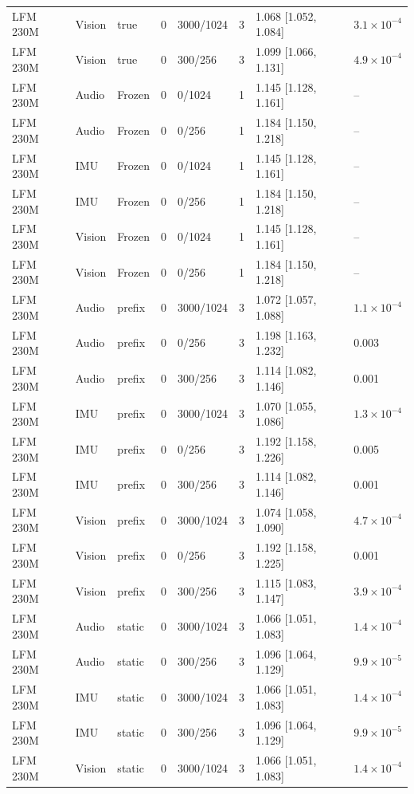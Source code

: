 {\begin{longtable}{@{}llllllll@{}}
LFM 230M & Vision & true & 0 & 3000/1024 & 3 & 1.068 [1.052, 1.084] & $3.1\times10^{-4}$ \\
LFM 230M & Vision & true & 0 & 300/256 & 3 & 1.099 [1.066, 1.131] & $4.9\times10^{-4}$ \\
LFM 230M & Audio & Frozen & 0 & 0/1024 & 1 & 1.145 [1.128, 1.161] & -- \\
LFM 230M & Audio & Frozen & 0 & 0/256 & 1 & 1.184 [1.150, 1.218] & -- \\
LFM 230M & IMU & Frozen & 0 & 0/1024 & 1 & 1.145 [1.128, 1.161] & -- \\
LFM 230M & IMU & Frozen & 0 & 0/256 & 1 & 1.184 [1.150, 1.218] & -- \\
LFM 230M & Vision & Frozen & 0 & 0/1024 & 1 & 1.145 [1.128, 1.161] & -- \\
LFM 230M & Vision & Frozen & 0 & 0/256 & 1 & 1.184 [1.150, 1.218] & -- \\
LFM 230M & Audio & prefix & 0 & 3000/1024 & 3 & 1.072 [1.057, 1.088] & $1.1\times10^{-4}$ \\
LFM 230M & Audio & prefix & 0 & 0/256 & 3 & 1.198 [1.163, 1.232] & 0.003 \\
LFM 230M & Audio & prefix & 0 & 300/256 & 3 & 1.114 [1.082, 1.146] & 0.001 \\
LFM 230M & IMU & prefix & 0 & 3000/1024 & 3 & 1.070 [1.055, 1.086] & $1.3\times10^{-4}$ \\
LFM 230M & IMU & prefix & 0 & 0/256 & 3 & 1.192 [1.158, 1.226] & 0.005 \\
LFM 230M & IMU & prefix & 0 & 300/256 & 3 & 1.114 [1.082, 1.146] & 0.001 \\
LFM 230M & Vision & prefix & 0 & 3000/1024 & 3 & 1.074 [1.058, 1.090] & $4.7\times10^{-4}$ \\
LFM 230M & Vision & prefix & 0 & 0/256 & 3 & 1.192 [1.158, 1.225] & 0.001 \\
LFM 230M & Vision & prefix & 0 & 300/256 & 3 & 1.115 [1.083, 1.147] & $3.9\times10^{-4}$ \\
LFM 230M & Audio & static & 0 & 3000/1024 & 3 & 1.066 [1.051, 1.083] & $1.4\times10^{-4}$ \\
LFM 230M & Audio & static & 0 & 300/256 & 3 & 1.096 [1.064, 1.129] & $9.9\times10^{-5}$ \\
LFM 230M & IMU & static & 0 & 3000/1024 & 3 & 1.066 [1.051, 1.083] & $1.4\times10^{-4}$ \\
LFM 230M & IMU & static & 0 & 300/256 & 3 & 1.096 [1.064, 1.129] & $9.9\times10^{-5}$ \\
LFM 230M & Vision & static & 0 & 3000/1024 & 3 & 1.066 [1.051, 1.083] & $1.4\times10^{-4}$ \\

\end{longtable}}
